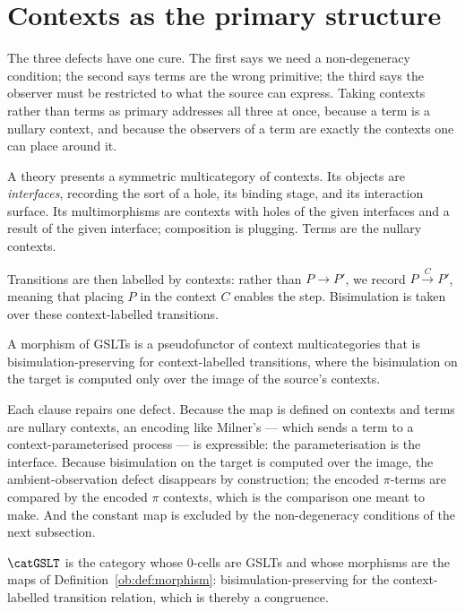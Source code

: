 \section{Contexts as the primary structure}

The three defects have one cure. The first says we need a non-degeneracy condition; the
second says terms are the wrong primitive; the third says the observer must be
restricted to what the source can express. Taking contexts rather than terms as primary
addresses all three at once, because a term is a nullary context, and because the
observers of a term are exactly the contexts one can place around it.

A theory presents a symmetric multicategory of contexts. Its objects are
\emph{interfaces}, recording the sort of a hole, its binding stage, and its interaction
surface. Its multimorphisms are contexts with holes of the given interfaces and a result
of the given interface; composition is plugging. Terms are the nullary contexts.

Transitions are then labelled by contexts: rather than $P \to P'$, we record
$P \xrightarrow{\;C\;} P'$, meaning that placing $P$ in the context $C$ enables the step.
Bisimulation is taken over these context-labelled transitions.

\begin{definition}
\label{ob:def:morphism}
A morphism of GSLTs is a pseudofunctor of context multicategories that is
bisimulation-preserving for context-labelled transitions, where the bisimulation on the
target is computed only over the image of the source's contexts.
\end{definition}

Each clause repairs one defect. Because the map is defined on contexts and terms are
nullary contexts, an encoding like Milner's --- which sends a term to a
context-parameterised process --- is expressible: the parameterisation is the interface.
Because bisimulation on the target is computed over the image, the ambient-observation
defect disappears by construction; the encoded $\pi$-terms are compared by the encoded
$\pi$ contexts, which is the comparison one meant to make. And the constant map is
excluded by the non-degeneracy conditions of the next subsection.

\begin{definition}
\label{ob:def:GSLTcat}
$\catGSLT$ is the category whose $0$-cells are GSLTs and whose morphisms are the maps of
Definition~\ref{ob:def:morphism}: bisimulation-preserving for the context-labelled
transition relation, which is thereby a congruence.
\end{definition}

